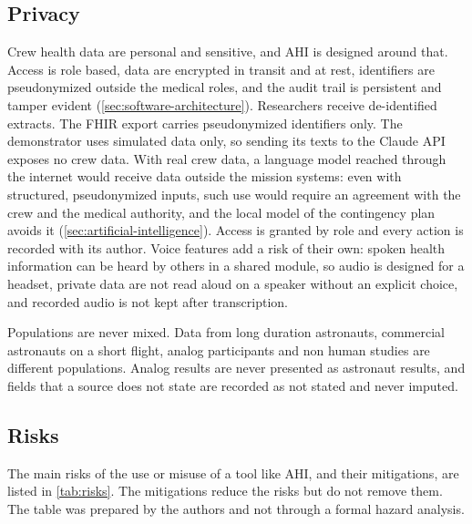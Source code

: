 \subsection{Privacy}
\label{subsec:privacy}

Crew health data are personal and sensitive, and AHI is designed around that. Access is role based, data are encrypted in transit and at rest, identifiers are pseudonymized outside the medical roles, and the audit trail is persistent and tamper evident (\ref{sec:software-architecture}). Researchers receive de-identified extracts. The FHIR export carries pseudonymized identifiers only. The demonstrator uses simulated data only, so sending its texts to the Claude API exposes no crew data. With real crew data, a language model reached through the internet would receive data outside the mission systems: even with structured, pseudonymized inputs, such use would require an agreement with the crew and the medical authority, and the local model of the contingency plan avoids it (\ref{sec:artificial-intelligence}). Access is granted by role and every action is recorded with its author. Voice features add a risk of their own: spoken health information can be heard by others in a shared module, so audio is designed for a headset, private data are not read aloud on a speaker without an explicit choice, and recorded audio is not kept after transcription.

Populations are never mixed. Data from long duration astronauts, commercial astronauts on a short flight, analog participants and non human studies are different populations. Analog results are never presented as astronaut results, and fields that a source does not state are recorded as not stated and never imputed.

\subsection{Risks}
\label{subsec:risks}

The main risks of the use or misuse of a tool like AHI, and their mitigations, are listed in \ref{tab:risks}. The mitigations reduce the risks but do not remove them. The table was prepared by the authors and not through a formal hazard analysis.

